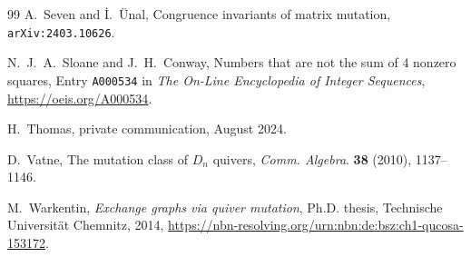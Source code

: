 \documentclass[11pt, letterpaper]{amsart}
\theoremstyle{definition}
\numberwithin{equation}{section}
\begin{document}
\begin{thebibliography}{99}
A.~Seven and \.I.~\"Unal, 
Congruence invariants of matrix mutation, 
\texttt{arXiv:2403.10626}. 

N.~J.~A.~Sloane and J.~H.~Conway, 
Numbers that are not the sum of $4$ nonzero squares,
Entry \texttt{A000534} in {\em The On-Line Encyclopedia of Integer Sequences},
\url{https://oeis.org/A000534}.

H.~Thomas,
private communication, August 2024.

D.~Vatne, 
The mutation class of $D_n$ quivers, 
{\em Comm. Algebra}. 
\textbf{38} (2010), 1137--1146. %


M.~Warkentin,  %
\emph{Exchange graphs via quiver mutation}, 
Ph.D. thesis, 
Technische Universit\"at Chemnitz, %
2014, 
\url{https://nbn-resolving.org/urn:nbn:de:bsz:ch1-qucosa-153172}.

\end{thebibliography}
\end{document}
